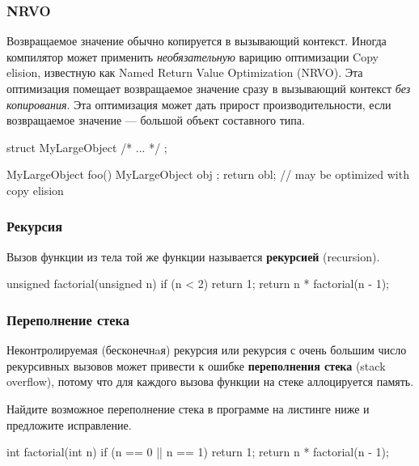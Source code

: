 \documentclass[compress, 8pt]{beamer}
\begin{document}
\begin{frame}[fragile]

    \frametitle{NRVO}

    Возвращаемое значение обычно копируется в вызывающий контекст.
    Иногда компилятор может применить \textit{необязательную} варицию оптимизации
    Copy elision, известную как Named Return Value Optimization (NRVO).
    Эта оптимизация помещает возвращаемое значение сразу в вызывающий контекст
    \textit{без копирования}.
    Эта оптимизация может дать прирост производительности, если возвращаемое значение
    --- большой объект составного типа.

    \begin{myinplacelisting}[minted language=cpp]
struct MyLargeObject { /* ... */ };

MyLargeObject foo() {
    MyLargeObject obj {};
    return obl; // may be optimized with copy elision
}
    \end{myinplacelisting}

\end{frame}

\begin{frame}[fragile]

    \frametitle{Рекурсия}

    Вызов функции из тела той же функции называется \textbf{рекурсией} (recursion).

    \begin{myinplacelisting}[minted language=cpp]
unsigned factorial(unsigned n) {
    if (n < 2) {
        return 1;
    }
    return n * factorial(n - 1);
}
    \end{myinplacelisting}

\end{frame}

\begin{frame}[fragile]

    \frametitle{Переполнение стека}

    Неконтролируемая (бесконечнaя) рекурсия или рекурсия с очень большим число рекурсивных
    вызовов может привести к ошибке \textbf{переполнения стека}\footnotemark{}
    (stack overflow), потому что для каждого вызова функции на стеке аллоцируется память.


    \begin{task}
        Найдите возможное переполнение стека в программе на листинге ниже и предложите
        исправление.
    \end{task}

    \begin{myinplacelisting}[%
        minted language=cpp,
        minted options={
            fontsize=\normalsize,
            breaklines,
            breakanywhere,
            linenos,
            escapeinside=??,
            numbersep=2pt
        },
    ]
int factorial(int n) {
    if (n == 0 || n == 1) {
        return 1;
    }
    return n * factorial(n - 1);
}
    \end{myinplacelisting}

\end{frame}
\end{document}
